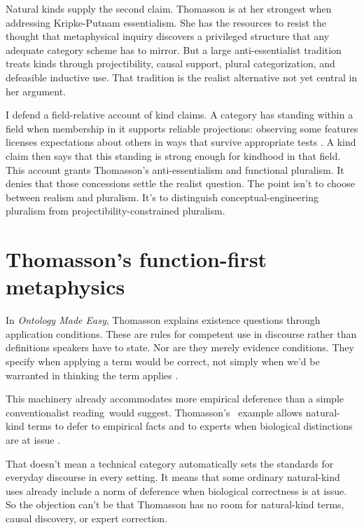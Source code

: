 \documentclass[12pt]{article}
\begin{document}
Natural kinds supply the second claim. Thomasson is at her strongest when addressing Kripke-Putnam essentialism. She has the resources to resist the thought that metaphysical inquiry discovers a privileged structure that any adequate category scheme has to mirror. But a large anti-essentialist tradition treats kinds through projectibility, causal support, plural categorization, and defeasible inductive use. That tradition is the realist alternative not yet central in her argument.

I defend a field-relative account of kind claims. A category has standing within a field when membership in it supports reliable projections: observing some features licenses expectations about others in ways that survive appropriate tests \citep{Goodman1955}. A kind claim then says that this standing is strong enough for kindhood in that field. This account grants Thomasson's anti-essentialism and functional pluralism. It denies that those concessions settle the realist question. The point isn't to choose between realism and pluralism. It's to distinguish conceptual-engineering pluralism from projectibility-constrained pluralism.

\section{Thomasson's function-first metaphysics}

In \emph{Ontology Made Easy}, Thomasson explains existence questions through application conditions. These are rules for competent use in discourse rather than definitions speakers have to state. Nor are they merely evidence conditions. They specify when applying a term would be correct, not simply when we'd be warranted in thinking the term applies \citep[93--95]{thomasson2014ontology}.

This machinery already accommodates more empirical deference than a simple conventionalist reading\ would suggest. Thomasson's \ example allows natural-kind terms to defer to empirical facts and to experts when biological distinctions are at issue \citep[94]{thomasson2014ontology}.

That doesn't mean a technical category automatically sets the standards for everyday discourse in every setting. It means that some ordinary natural-kind uses already include a norm of deference when biological correctness is at issue. So the objection can't be that Thomasson has no room for natural-kind terms, causal discovery, or expert correction.
\end{document}
